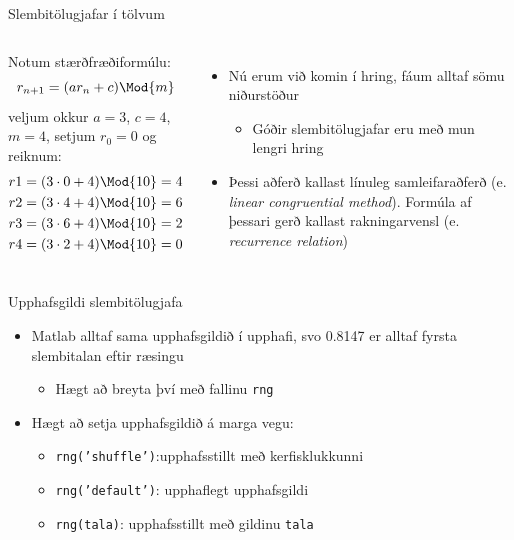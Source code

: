 \documentclass[handout]{beamer}
\begin{document}
\begin{frame}{Slembitölugjafar í tölvum}
\begin{columns}
Notum stærðfræðiformúlu:
\[
r_{n+1} = (ar_n + c) \Mod{m}
\]
veljum okkur $a=3$, $c=4$, $m=4$, setjum $r_0 = 0$ og reiknum:
\begin{align*}
r1 = (3 \cdot 0 + 4) \Mod{10}  &=  4\\
r2 = (3 \cdot 4 + 4) \Mod{10}  &=  6\\
r3 = (3 \cdot 6 + 4) \Mod{10}  &=  2\\
r4 = (3 \cdot 2 + 4) \Mod{10}  &=  0\\
\end{align*}
\begin{itemize}
\item Nú erum við komin í hring, fáum alltaf sömu niðurstöður
 \begin{itemize}
  \item Góðir slembitölugjafar eru með mun lengri hring
 \end{itemize}
 \item Þessi aðferð kallast línuleg samleifaraðferð (e. \emph{linear congruential method}). Formúla af þessari gerð kallast rakningarvensl (e. \emph{recurrence relation})
\end{itemize}
\end{columns}
\end{frame}

\begin{frame}{Upphafsgildi slembitölugjafa}
\begin{itemize}
 \item Matlab alltaf sama upphafsgildið í upphafi, svo 0.8147 er alltaf fyrsta slembitalan eftir ræsingu
 \begin{itemize}
  \item Hægt að breyta því með fallinu \texttt{rng}
 \end{itemize}
 \item Hægt að setja upphafsgildið á marga vegu:
 \begin{itemize}
  \item \texttt{rng('shuffle')}:upphafsstillt með kerfisklukkunni
  \item \texttt{rng('default')}: upphaflegt upphafsgildi
  \item \texttt{rng(tala)}: upphafsstillt með gildinu \texttt{tala}
 \end{itemize}
\end{itemize}
\end{frame}
\end{document}
